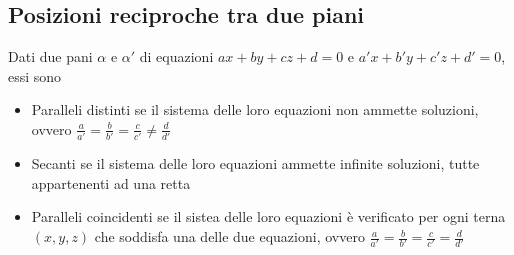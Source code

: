 \documentclass{article}     %
\begin{document}
        \subsection{Posizioni reciproche tra due piani}
            Dati due pani $\alpha$ e $\alpha'$ di equazioni $ax+by+cz+d=0$ e $a'x+b'y+c'z+d'=0$, essi sono
            \begin{itemize}
                \item Paralleli distinti se il sistema delle loro equazioni non ammette soluzioni, ovvero $\frac{a}{a'}=\frac{b}{b'}=\frac{c}{c'}\neq\frac{d}{d'}$
                \item Secanti se il sistema delle loro equazioni ammette infinite soluzioni, tutte appartenenti ad una retta
                \item Paralleli coincidenti se il sistea delle loro equazioni è verificato per ogni terna $(x,y,z)$ che soddisfa una delle due equazioni, ovvero $\frac{a}{a'}=\frac{b}{b'}=\frac{c}{c'}=\frac{d}{d'}$
            \end{itemize}
\end{document}
